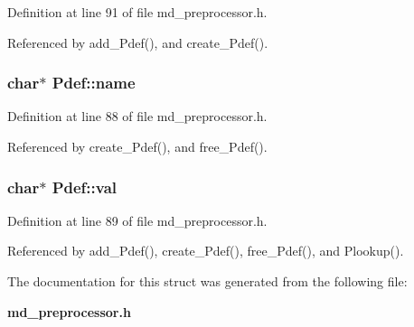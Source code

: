 Definition at line 91 of file md\_\-preprocessor.h.

Referenced by add\_\-Pdef(), and create\_\-Pdef().
\subsubsection{\setlength{\rightskip}{0pt plus 5cm}char$\ast$ \bf{Pdef::name}}\label{structPdef_ab44405ba4f8ff1f5b950c8706a339f9}




Definition at line 88 of file md\_\-preprocessor.h.

Referenced by create\_\-Pdef(), and free\_\-Pdef().
\subsubsection{\setlength{\rightskip}{0pt plus 5cm}char$\ast$ \bf{Pdef::val}}\label{structPdef_046b8aa0a11e051866e66c93892c3b4a}




Definition at line 89 of file md\_\-preprocessor.h.

Referenced by add\_\-Pdef(), create\_\-Pdef(), free\_\-Pdef(), and Plookup().

The documentation for this struct was generated from the following file:\begin{CompactItemize}
\item 
\bf{md\_\-preprocessor.h}\end{CompactItemize}
